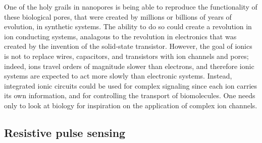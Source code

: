 			One of the holy grails in nanopores is being able to reproduce the functionality of these biological pores, that were created by millions or billions of years of evolution, in synthetic systems. The ability to do so could create a revolution in ion conducting systems, analagous to the revolution in electronics that was created by the invention of the solid-state transistor. However, the goal of ionics is not to replace wires, capacitors, and transistors with ion channels and pores; indeed, ions travel orders of magnitude slower than electrons, and therefore ionic systems are expected to act more slowly than electronic systems. Instead, integrated ionic circuits could be used for complex signaling since each ion carries its own information, and for controlling the transport of biomolecules. One needs only to look at biology for inspiration on the application of complex ion channels.
			
		\subsection{Resistive pulse sensing}
			

			
			
			

			
			
			
			

			
			


			
		





